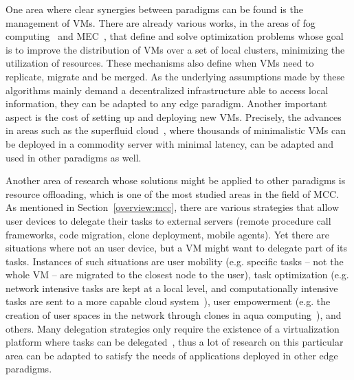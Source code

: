 \documentclass[twocolumn,preprint,3p]{elsarticle}
\begin{document}
One area where clear synergies between paradigms can be found is the management of VMs. There are already various works, in the areas of fog computing~\cite{Kavvadia15} and MEC~\cite{Oueis15}, that define and solve optimization problems whose goal is to improve the distribution of VMs over a set of local clusters, minimizing the utilization of resources. These mechanisms also define when VMs need to replicate, migrate and be merged. As the underlying assumptions made by these algorithms mainly demand a decentralized infrastructure able to access local information, they can be adapted to any edge paradigm. Another important aspect is the cost of setting up and deploying new VMs. Precisely, the advances in areas such as the superfluid cloud~\cite{Manco2015}, where thousands of minimalistic VMs can be deployed in a commodity server with minimal latency, can be adapted and used in other paradigms as well.

Another area of research whose solutions might be applied to other paradigms is resource offloading, which is one of the most studied areas in the field of MCC. As mentioned in Section~\ref{overview:mcc}, there are various strategies that allow user devices to delegate their tasks to external servers (remote procedure call frameworks, code migration, clone deployment, mobile agents). Yet there are situations where not an user device, but a VM might want to delegate part of its tasks. Instances of such situations are user mobility (e.g. specific tasks -- not the whole VM -- are migrated to the closest node to the user), task optimization (e.g. network intensive tasks are kept at a local level, and computationally intensive tasks are sent to a more capable cloud system~\cite{Ottenwalder13MigCEP}), user empowerment (e.g. the creation of user spaces in the network through clones in aqua computing~\cite{Magurawalage15}), and others. Many delegation strategies only require the existence of a virtualization platform where tasks can be delegated~\cite{WangMCC15}, thus a lot of research on this particular area can be adapted to satisfy the needs of applications deployed in other edge paradigms.
\end{document}
